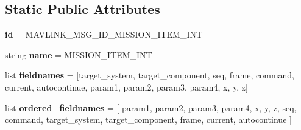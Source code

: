 \subsection*{Static Public Attributes}
\begin{DoxyCompactItemize}
\item 
\mbox{\label{classpymavlink_1_1dialects_1_1v10_1_1MAVLink__mission__item__int__message_a800517e147b289edac7c49193147b0a5}} 
{\bfseries id} = M\+A\+V\+L\+I\+N\+K\+\_\+\+M\+S\+G\+\_\+\+I\+D\+\_\+\+M\+I\+S\+S\+I\+O\+N\+\_\+\+I\+T\+E\+M\+\_\+\+I\+NT
\item 
\mbox{\label{classpymavlink_1_1dialects_1_1v10_1_1MAVLink__mission__item__int__message_ae1b259845b9e39dee4f1bcfd35d900b0}} 
string {\bfseries name} = \textquotesingle{}M\+I\+S\+S\+I\+O\+N\+\_\+\+I\+T\+E\+M\+\_\+\+I\+NT\textquotesingle{}
\item 
\mbox{\label{classpymavlink_1_1dialects_1_1v10_1_1MAVLink__mission__item__int__message_aa54ebaad895f387476b546f361cc17b5}} 
list {\bfseries fieldnames} = \mbox{[}\textquotesingle{}target\+\_\+system\textquotesingle{}, \textquotesingle{}target\+\_\+component\textquotesingle{}, \textquotesingle{}seq\textquotesingle{}, \textquotesingle{}frame\textquotesingle{}, \textquotesingle{}command\textquotesingle{}, \textquotesingle{}current\textquotesingle{}, \textquotesingle{}autocontinue\textquotesingle{}, \textquotesingle{}param1\textquotesingle{}, \textquotesingle{}param2\textquotesingle{}, \textquotesingle{}param3\textquotesingle{}, \textquotesingle{}param4\textquotesingle{}, \textquotesingle{}x\textquotesingle{}, \textquotesingle{}y\textquotesingle{}, \textquotesingle{}z\textquotesingle{}\mbox{]}
\item 
\mbox{\label{classpymavlink_1_1dialects_1_1v10_1_1MAVLink__mission__item__int__message_a464a541f7d665f9d0bb422f08ab4bed5}} 
list {\bfseries ordered\+\_\+fieldnames} = \mbox{[} \textquotesingle{}param1\textquotesingle{}, \textquotesingle{}param2\textquotesingle{}, \textquotesingle{}param3\textquotesingle{}, \textquotesingle{}param4\textquotesingle{}, \textquotesingle{}x\textquotesingle{}, \textquotesingle{}y\textquotesingle{}, \textquotesingle{}z\textquotesingle{}, \textquotesingle{}seq\textquotesingle{}, \textquotesingle{}command\textquotesingle{}, \textquotesingle{}target\+\_\+system\textquotesingle{}, \textquotesingle{}target\+\_\+component\textquotesingle{}, \textquotesingle{}frame\textquotesingle{}, \textquotesingle{}current\textquotesingle{}, \textquotesingle{}autocontinue\textquotesingle{} \mbox{]}

\end{DoxyCompactItemize}
